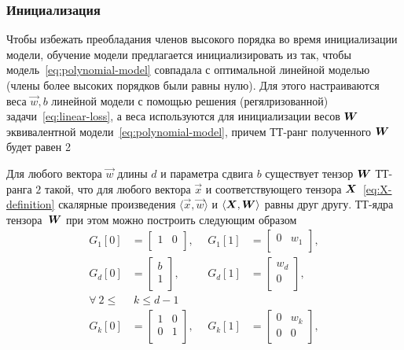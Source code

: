 \subsubsection{Инициализация \label{sec:exm-initialization}}
Чтобы избежать преобладания членов высокого порядка во время инициализации модели, обучение модели предлагается инициализировать из так, чтобы модель~\eqref{eq:polynomial-model} совпадала с оптимальной линейной моделью (члены более высоких порядков были равны нулю). Для этого настраиваются веса $\vec{w}, b$ линейной модели с помощью решения (регялризованной) задачи~\eqref{eq:linear-loss}, а веса используются для инициализации весов $\boldsymbol{W}$ эквивалентной модели~\eqref{eq:polynomial-model}, причем ТТ-ранг полученного $\boldsymbol{W}$ будет равен 2
\begin{theorem}
\label{thm:initialization-rank}
Для любого вектора $\vec{w}$ длины $d$ и параметра сдвига $b$ существует тензор $\boldsymbol{W}$ ТТ-ранга $2$ такой, что для любого вектора $\vec{x}$ и соответствующего тензора $\boldsymbol{X}$~\eqref{eq:X-definition} скалярные произведения $\langle \vec{x}, \vec{w} \rangle$ и $\langle \boldsymbol{X}, \boldsymbol{W} \rangle$ равны друг другу. ТТ-ядра тензора~$\boldsymbol{W}$ при этом можно построить следующим образом
\begin{equation}
\begin{aligned}
\label{eq:initialization-cores}
G_1[0] &=
\left[
\begin{array}{cc}
1 & 0\\
\end{array}
\right], ~~&
G_1[1] &=
\left[
\begin{array}{cc}
0 & w_1\\
\end{array}
\right], \\
G_d[0] &=
\left[
\begin{array}{c}
b\\
1\\
\end{array}
\right], ~~&
G_d[1] &=
\left[
\begin{array}{c}
w_d\\
0\\
\end{array}
\right], ~~\\[0.2cm]
\forall ~ 2 \leq & ~k \leq d-1 & &\\[-0.05cm]
G_k[0] &=
\left[
\begin{array}{cc}
1 & 0 \\
0 & 1 \\
\end{array}
\right], ~~&
G_k[1] &=
\left[
\begin{array}{cc}
0 & w_k \\
0 & 0 \\
\end{array}
\right],
\end{aligned}
\end{equation} 

\end{theorem}

